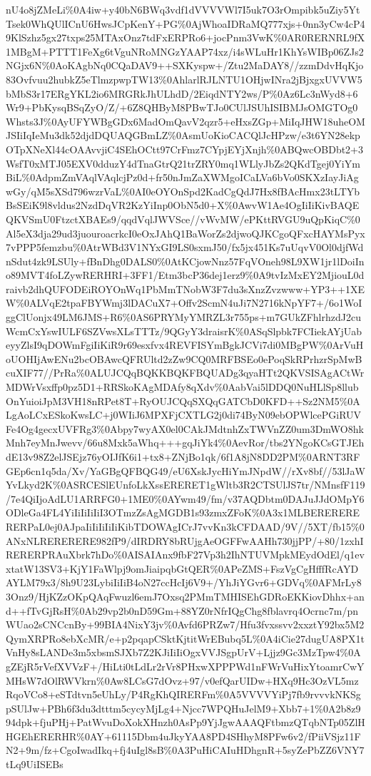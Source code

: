 \documentclass[]{article}
\begin{document}
nU4o8jZMeLi\%0A4iw+y40bN6BWq3vdf1dVVVVWl7I5uk7O3rOmpibk5uZiy5YtTsek0WhQUlICnU6HwsJCpKenY+PG\%0AjWhoaIDRaMQ777xjs+0nn3yCw4cP49KlSzhz5gx27txps25MTAxOnz7tdFxERPRo6+jocPnm3VwK\%0AR0RERNRL9fX1MBgM+PTTT1FeXg6tVguNRoMNGzYAAP74xz/i4sWLuHr1KhYsWIBp06ZJs2NGjx6N\%0AoKAgbNq0CQaDAV9++SXKyspw+/Ztu2MaDAY8//zzmDdvHqKjo83Ovfvuu2hubkZ5eTlmzpwpTW13\%0AhlarlRJLNTU1OHjwINra2jBjxgxUVVW5bMbS3r17ERgYKL2io6MRGRkJhULhdD/2EiqdNTY2ws/P\%0Az6Lc3nWyd8+6Wr9+PbKysqBSqZyO/Z/+6Z8QHByM8PBwTJo0CUlJSUhISIBMJsOMGTOg0Whsts3J\%0AyUFYWBgGDx6MadOmQavV2qzr5+eHxsZGp+MiIqJHW18uheOMJSIiIqIeMu3dk52djdDQUAQGBmLZ\%0AsmUoKioCACQlJcHPzw/e3t6YN28ekpOTpXNeXl44cOAAvvjiC4SEhOCtt97CrFmz7CYpjEYjXnjh\%0ABQwcOBDbt2+3WsfT0xMTJ05EXV0dduzY4dTnaGtrQ21trZRY0mq1WLlyJbZs2QKdTgej0YiYmBiL\%0AdpmZmVAqlVAqlcjPz0d+fr50nJmZaXWMgoICaLVa6bVo0SKXzIayJiAgwGy/qM5sXSd796wzrVaL\%0AI0eOYOnSpd2KadCgQdJ7Hx8fBAcHmx23tLTYbBsSEiK9l8vldus2NzdDqVR2KzYiInp0ObN5d0+X\%0AwvW1Ae4OgIiIiKivBAQEQKVSmU0FtzctXBAEs9/qqdVqlJWVSce//vWvMW/ePKttRVGU9uQpKiqC\%0Al5eX3dja29ud3juouroacrkcI0eOxJAhQ1BaWorZs2djwoQJKCgoQFxcHAYMsPyx7vPPP5femzbu\%0AtrWBd3V1NYxGI9LS0sxmJ50/fx5jx451Ks7uUqvV0Ol0djfWdnSdut4zk9LSUly+fBnDhg0DALS0\%0AtKCjowNnz57FqVOneh98L9XW1jr1lDoiIno89MVT4foLZywRERHRI+3FF1/Etm3bcP36dej1erz9\%0A9tvIzMxEY2MjiouL0draivb2dhQUFODEiROYOnWq1PbMmTNobW3F7du3sXnzZvzwww+YP3++1XEW\%0ALVqE2tpaFBYWmj3lDACuX7+Offv2ScmN4uJi7N2716kNpYF7+/6o1WoIggClUonjx49LM6JMS+R6\%0AS6PRYMyYMRZL3r755ps+m7GUkZFhlrhzdJ2cuWcmCxYswIULF6SZVwsXLsTTTz/9QGyY3draisrK\%0ASqSlpbk7FCIiekAYjUabeyyZlsI9qDOWmFgiIiKiR9r69esxfvx4REVFISYmBgkJCVi7di0MBgPW\%0ArVuHoUOHIjAwENu2bcOBAwcQFRUltd2zZw9CQ0MRFBSEo0ePoqSkRPrhzrSpMwBcuXIF77//PrRa\%0ALUJCQqBQKKBQKFBQUADg3qyaHTt2QKVSISAgACtWrMDWrVsxffp0pz5D1+RRSkoKAgMDAfy8qXdv\%0AabVai5lDDQ0NuHLlSp8llubOnYuioiJpM3VH18nRPet8T+RyOUJCQqSXQqGATCbD0KFD++Sz2NM5\%0ALgAoLCxESkoKwsLC+j0WIiJ6MPXFjCXTLG2j0di74ByN09ebOPWlcePGiRUVFe4Og4gecxUVFRg3\%0Abpy7wyAX0el0CAkJMdtnhZxTWVnZZ0um3DmWO8hkMnh7eyMnJwevv/66u8Mxk5aWhq+++gqJiYk4\%0AevRor/tbs2YNgoKCsGTJEhdE13v98Z2elJSEjz76yOIJfK6i1+tx8+ZNjBo1qk/6f1A8jN8DD2PM\%0ARNT3RFGEp6cn1q5da/Xv/YaGBgQFBQG49/eU6XskJycHiYmJNpdW//rXv8bf//53lJaWYvLkyd2K\%0ASRCESlEUnfoLkXssERERET1gWltb3R2CTSUlJS7tr/NMnsfF119/7e4QiIjoAdLU1ARRFG0+1ME0\%0AYwm49/fm/v37AQDbtm0DAJuJJdOMpY6ODleGa4FL4YiIiIiIiIiI3OTmzZsAgMGDB1s93zmxZFoK\%0A3x1MLBERERERERERPaL0ej0AJpaIiIiIiIiIiKibTDOWAgICrJ7vvKn3kCFDAAD/9V//5XT/fb15\%0ANxNLRERERERE982fP9/dIRDRY8bRUjgAeOGFFwAAHh730jjPP/+80/1zxhIRERERPRAuXbrk7hDo\%0AISAIAnx9fbF27Vp3h2IhNTUVMpkMEydOdEl/q1evxtatW13SV3+KjY1FaWlpj9omJiaipqbGtQER\%0APeZMS+FszVgCgHfffRcAYDAYLM79x3/8h9U23LybiIiIiB4oN27ccHcIj6V9+/YhJiYGvr6+GDVq\%0AFMrLy83Onz9/HjKZzOKpQAqFwuzl6emJ7Oxsq2PMmTMHISEhGDRoEKKiovDhhx+and++fTvGjRsH\%0Ab29vp2b0nD59Gm+88YZ0rNfrIQgChg8fblavrq4Ocrnc7m/pnWUao2sCNCcnBy+99BIA4NixY3jv\%0Avfd6PRZw7/Hfu3fvxssvv2xxztY92bx5M2QymXRPRo8ebXcMR/e+p2pqapCSktKjtitWrEBubq5L\%0A4iCie27dugUA8PX1tVnHy8sLANDe3m5xbsmSJXb7Z2KJiIiIiOgxVVJSgpUrV+Ljjz9Gc3MzTpw4\%0AgZEjR5rVefXVVzF+/HiLti0tLdLr2rVr8PHxwXPPPWd1nFWrVuHixYtoamrCwYMHsW7dOlRWVkrn\%0Aw8LCsG7dOvz+97/v0efQarUIDw+HXq9Hc3OzVL5mzRqoVCo8+eSTdtvn5eUhLy/P4RgKhQIRERFm\%0A5VVVVYiPj7fb9rvvvkNKSgpSUlJw+PBh6f3du3dtttm5cycyMjLg4+Njcc7WPQHuJelM9+Xbb7+1\%0A2b8z994dpk+fjuPHj+PatWvuDoXokXHnzh0AsPp9YjJgwAAAQFtbmzQTqbNTp05ZlHHGEhERERHR\%0AY+61115Dbm4uJkyYAA8PD4SHhyM8PFw6v2/fPiiVSjz11FN2+9m/fz+CgoIwadIkq+fj4uIgl8sB\%0A3PuHiCAIuHDhgnR+5syZePbZZ6VNY7tLq9UiISEBs
\end{document}
